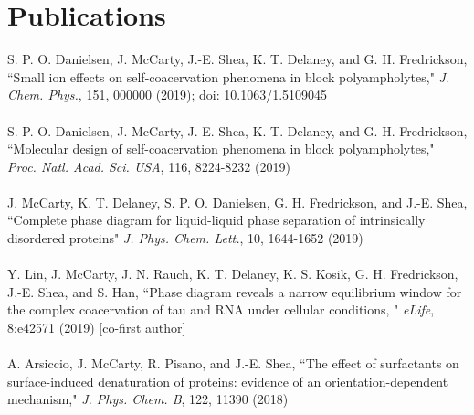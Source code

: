 \documentclass[10pt]{article} %
\begin{document}
\section{Publications}
S. P. O. Danielsen, J. McCarty, J.-E. Shea, K. T. Delaney, and G. H. Fredrickson, ``Small ion effects on self-coacervation phenomena in block polyampholytes,"  {\it J. Chem. Phys.}, 151, 000000 (2019); doi: 10.1063/1.5109045 \\
\\
S. P. O. Danielsen, J. McCarty, J.-E. Shea, K. T. Delaney, and G. H. Fredrickson, ``Molecular design of self-coacervation phenomena in block polyampholytes," {\it Proc. Natl. Acad. Sci. USA}, 116, 8224-8232 (2019) \\
\\
J. McCarty, K. T. Delaney, S. P. O. Danielsen, G. H. Fredrickson, and J.-E. Shea, ``Complete phase diagram for liquid-liquid phase separation of intrinsically disordered proteins" {\it J. Phys. Chem. Lett.}, 10, 1644-1652  (2019)\\
\\
Y. Lin, J. McCarty, J. N. Rauch, K. T. Delaney, K. S. Kosik, G. H. Fredrickson, J.-E. Shea, and S. Han, ``Phase diagram reveals a narrow equilibrium window for the complex coacervation of tau and RNA under cellular conditions, " {\it eLife}, 8:e42571 (2019) [co-first author]\\
\\
A. Arsiccio, J. McCarty, R. Pisano, and J.-E. Shea, ``The effect of surfactants on surface-induced denaturation of proteins: evidence of an orientation-dependent mechanism," {\it J. Phys. Chem. B}, 122, 11390 (2018)\\
\end{document}
